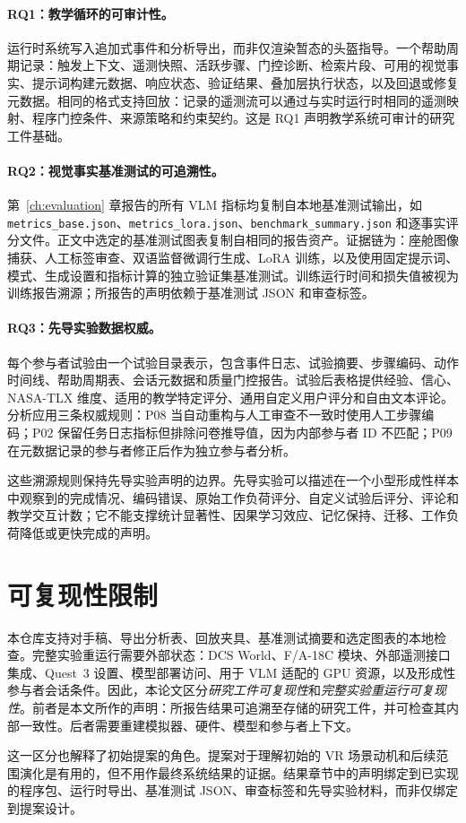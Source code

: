 \paragraph{RQ1：教学循环的可审计性。}运行时系统写入追加式事件和分析导出，而非仅渲染暂态的头盔指导。一个帮助周期记录：触发上下文、遥测快照、活跃步骤、门控诊断、检索片段、可用的视觉事实、提示词构建元数据、响应状态、验证结果、叠加层执行状态，以及回退或修复元数据。相同的格式支持回放：记录的遥测流可以通过与实时运行时相同的遥测映射、程序门控条件、来源策略和约束契约。这是 RQ1 声明教学系统可审计的研究工件基础。

\paragraph{RQ2：视觉事实基准测试的可追溯性。}第~\ref{ch:evaluation} 章报告的所有 VLM 指标均复制自本地基准测试输出，如 \texttt{metrics\_base.json}、\texttt{metrics\_lora.json}、\texttt{benchmark\_summary.json} 和逐事实评分文件。正文中选定的基准测试图表复制自相同的报告资产。证据链为：座舱图像捕获、人工标签审查、双语监督微调行生成、LoRA 训练，以及使用固定提示词、模式、生成设置和指标计算的独立验证集基准测试。训练运行时间和损失值被视为训练报告溯源；所报告的声明依赖于基准测试 JSON 和审查标签。

\paragraph{RQ3：先导实验数据权威。}每个参与者试验由一个试验目录表示，包含事件日志、试验摘要、步骤编码、动作时间线、帮助周期表、会话元数据和质量门控报告。试验后表格提供经验、信心、NASA-TLX 维度、适用的教学特定评分、通用自定义用户评分和自由文本评论。分析应用三条权威规则：P08 当自动重构与人工审查不一致时使用人工步骤编码；P02 保留任务日志指标但排除问卷推导值，因为内部参与者 ID 不匹配；P09 在元数据记录的参与者修正后作为独立参与者分析。

这些溯源规则保持先导实验声明的边界。先导实验可以描述在一个小型形成性样本中观察到的完成情况、编码错误、原始工作负荷评分、自定义试验后评分、评论和教学交互计数；它不能支撑统计显著性、因果学习效应、记忆保持、迁移、工作负荷降低或更快完成的声明。

\section{可复现性限制}\label{sec:impl-repro-limits}

本仓库支持对手稿、导出分析表、回放夹具、基准测试摘要和选定图表的本地检查。完整实验重运行需要外部状态：DCS World、F/A-18C 模块、外部遥测接口集成、Quest~3 设置、模型部署访问、用于 VLM 适配的 GPU 资源，以及形成性参与者会话条件。因此，本论文区分\emph{研究工件可复现性}和\emph{完整实验重运行可复现性}。前者是本文所作的声明：所报告结果可追溯至存储的研究工件，并可检查其内部一致性。后者需要重建模拟器、硬件、模型和参与者上下文。

这一区分也解释了初始提案的角色。提案对于理解初始的 VR 场景动机和后续范围演化是有用的，但不用作最终系统结果的证据。结果章节中的声明绑定到已实现的程序包、运行时导出、基准测试 JSON、审查标签和先导实验材料，而非仅绑定到提案设计。
